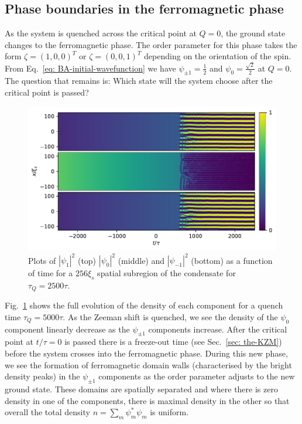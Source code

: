 \subsection{Phase boundaries in the ferromagnetic phase}
As the system is quenched across the critical point at \( Q = 0 \), the ground
state changes to the ferromagnetic phase.
The order parameter for this phase takes the form \(\zeta={(1,0,0)}^T\) or
\(\zeta={(0,0,1)}^T\) depending on the orientation of the spin.
From Eq.~\eqref{eq: BA-initial-wavefunction} we have
\(\psi_{\pm 1} = \frac{1}{2}\) and \(\psi_0 = \frac{\sqrt{2}}{2}\) at
\( Q = 0 \).
The question that remains is: Which state will the system choose after
the critical point is passed?
\begin{figure}[tb]
    \centering
    \includegraphics[width=\textwidth]{gfx/ch-spin1/BA-FM_all_densities.pdf}
    \caption[Component densities of the system as a function of time]
    {Plots of \(|\psi_1|^2\) (top) \(|\psi_0|^2\) (middle) and
        \(|\psi_{-1}|^2\) (bottom) as a function of time for a \(256\xi_s\)
        spatial subregion of the condensate for
        \( \tau_Q=2500\tau \).\label{fig: BA-FM-densities}}
\end{figure}
Fig.~\ref{fig: BA-FM-densities} shows the full evolution of the density of each
component for a quench time \( \tau_Q=5000\tau \).
As the Zeeman shift is quenched, we see the density of the \(\psi_0\) component
linearly decrease as the \(\psi_{\pm 1}\) components increase.
After the critical point at \(t/\tau=0\) is passed there is a freeze-out time
(see Sec.~\ref{sec: the-KZM}) before the system crosses into the ferromagnetic
phase.
During this new phase, we see the formation of ferromagnetic domain walls
(characterised by the bright density peaks) in the \(\psi_{\pm 1}\) components
as the order parameter adjusts to the new ground state.
These domains are spatially separated and where there is zero density in one of
the components, there is maximal density in the other so that overall the total
density \(n=\sum_m\psi_m^*\psi_m\) is uniform.

